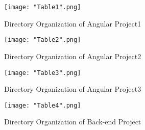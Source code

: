 \documentclass[10pt,journal,compsoc]{IEEEtran}
\begin{document}
\begin{figure}[p]
\centering
\texttt{[image: "Table1".png]}
{\caption*{Directory Organization of Angular Project1}}
\end{figure}
\clearpage
\bigskip
\begin{figure}[p]
\centering
\texttt{[image: "Table2".png]}
{\caption*{Directory Organization of Angular Project2}}
\end{figure}
\clearpage
\begin{figure}[p]
\centering
\texttt{[image: "Table3".png]}
{\caption*{Directory Organization of Angular Project3}}
\end{figure}

\clearpage
\begin{figure}[p]
\centering
\texttt{[image: "Table4".png]}
{\caption*{Directory Organization of Back-end Project}}
\end{figure}




%
%

\end{document}
